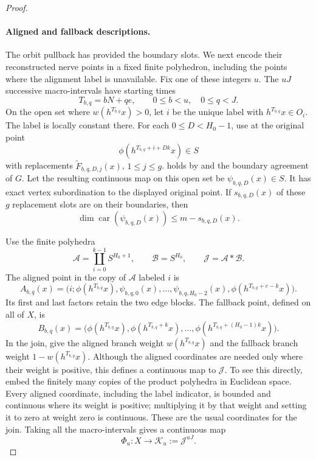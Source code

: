 \begin{proof}
\paragraph{Aligned and fallback descriptions.}
The orbit pullback has provided the boundary slots. We next encode their
reconstructed nerve points in a fixed finite polyhedron, including the
points where the alignment label is unavailable.
Fix one of these integers $u$.  The $uJ$ successive
macro-intervals have starting times
\[
 T_{b,q}=bN+qe,\qquad 0\le b<u,\quad 0\le q<J.
\]
On the open set where $w(h^{T_{b,q}}x)>0$, let $i$ be the unique
label with $h^{T_{b,q}}x\in O_i$.  The label is locally constant
there.  For each $0\le D<H_0-1$, use
 at the original point
\[
 \phi(h^{T_{b,q}+i+Dk}x)\in S
\]
with replacements $\widetilde F_{b,q,D,j}(x)$, $1\le j\le g$.
 holds by
 and the boundary agreement of $G$.
Let the resulting continuous map on this open set be
$\psi_{b,q,D}(x)\in S$.  It has exact vertex subordination to
the displayed original point.  If $s_{b,q,D}(x)$ of these $g$
replacement slots are on their boundaries, then
\begin{equation}
\label{eq:cover-updated-carrier}
 \dim\operatorname{car}(\psi_{b,q,D}(x))
 \le m-s_{b,q,D}(x).
\end{equation}

Use the finite polyhedra
\[
 \mathcal A=\coprod_{i=0}^{k-1}S^{H_0+1},
 \qquad \mathcal B=S^{H_0},
 \qquad \mathcal J=\mathcal A*\mathcal B.
\]
The aligned point in the copy of $\mathcal A$ labeled $i$ is
\begin{equation}
\label{eq:cover-aligned-description}
 A_{b,q}(x)=
 \bigl(i;\phi(h^{T_{b,q}}x),
       \psi_{b,q,0}(x),\ldots,\psi_{b,q,H_0-2}(x),
       \phi(h^{T_{b,q}+e-k}x)\bigr).
\end{equation}
Its first and last factors retain the two edge blocks.
The fallback point, defined on all of $X$, is
\begin{equation}
\label{eq:cover-fallback-description}
 B_{b,q}(x)=
 \bigl(\phi(h^{T_{b,q}}x),\phi(h^{T_{b,q}+k}x),
       \ldots,\phi(h^{T_{b,q}+(H_0-1)k}x)\bigr).
\end{equation}
In the join, give the aligned branch weight $w(h^{T_{b,q}}x)$
and the fallback branch weight $1-w(h^{T_{b,q}}x)$.
Although the aligned coordinates are needed only where their
weight is positive, this defines a continuous map to
$\mathcal J$.  To see this directly, embed the finitely many
copies of the product polyhedra in Euclidean space.  Every
aligned coordinate, including the label indicator, is bounded
and continuous where its weight is positive; multiplying it by
that weight and setting it to zero at weight zero is continuous.
These are the usual coordinates for the join.  Taking all the
macro-intervals gives a continuous map
\begin{equation}
\label{eq:cover-total-description}
 \Phi_u:X\longrightarrow\mathcal K_u:=\mathcal J^{uJ}.
\end{equation}


\end{proof}
